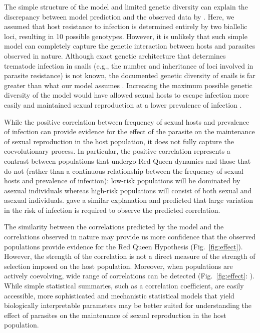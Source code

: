 \documentclass{article}\usepackage[]{graphicx}\usepackage[]{color}
\newcommand{\fref}[1]{Fig.~\ref{fig:#1}}
\begin{document}
The simple structure of the model and limited genetic diversity can explain the discrepancy between model prediction and the observed data by \cite{mckone2016fine}.
Here, we assumed that host resistance to infection is determined entirely by two biallelic loci, resulting in 10 possible genotypes.
However, it is unlikely that such simple model can completely capture the genetic interaction between hosts and parasites observed in nature.
Although exact genetic architecture that determines trematode infection in snails (e.g., the number and inheritance of loci involved in parasite resistance) is not known, the documented genetic diversity of snails is far greater than what our model assumes \citep{fox1996genetic, king2011parasites, dagan2013clonal}.
Increasing the maximum possible genetic diversity of the model would have allowed sexual hosts to escape infection more easily and maintained sexual reproduction at a lower prevalence of infection \citep{lively2010effect, king2012does, ashby2015diversity}.

While the positive correlation between frequency of sexual hosts and prevalence of infection can provide evidence for the effect of the parasite on the maintenance of sexual reproduction in the host population, it does not fully capture the coevolutionary process.
In particular, the positive correlation represents a contrast between populations that undergo Red Queen dynamics and those that do not (rather than a continuous relationship between the frequency of sexual hosts and prevalence of infection):
low-risk populations will be dominated by asexual individuals whereas high-risk populations will consist of both sexual and asexual individuals.
\cite{lively2001trematode} gave a similar explanation and predicted that large variation in the risk of infection is required to observe the predicted correlation.

The similarity between the correlations predicted by the model and the correlations observed in nature may provide us more confidence that the observed populations provide evidence for the Red Queen Hypothesis (\fref{effect}).
However, the strength of the correlation is not a direct measure of the strength of selection imposed on the host population.
Moreover, when populations are actively coevolving, wide range of correlations can be detected (\fref{effect}: \cite{vergara2014infection}).
While simple statistical summaries, such as a correlation coefficient, are easily accessible,
more sophisticated and mechanistic statistical models that yield biologically interpretable parameters may be better suited for understanding the effect of parasites on the maintenance of sexual reproduction in the host population.
\end{document}
